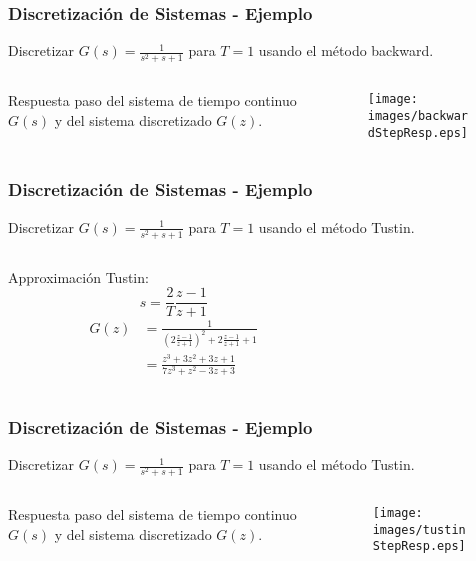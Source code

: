 \documentclass[aspectratio=169,handout]{beamer}
\theoremstyle{definition}
\theoremstyle{plain}
\theoremstyle{remark}
\begin{document}
\begin{frame}[c]\frametitle{Discretización de Sistemas - Ejemplo}
	\vspace*{3mm}	
	Discretizar $G(s) = \frac{1}{s^2 + s + 1}$ para $T=1$ usando el método backward.\\
	\begin{columns}
		\begin{column}{0.3\textwidth}
			Respuesta paso del sistema de tiempo continuo $G(s)$ y del sistema discretizado $G(z)$.
		\end{column}
		\begin{column}{0.7\textwidth}
			\begin{figure}
				\centering
				\texttt{[image: images/backwardStepResp.eps]}
			\end{figure}
		\end{column}
	\end{columns}
\end{frame}

\begin{frame}[c]\frametitle{Discretización de Sistemas - Ejemplo}
	\vspace*{3mm}	
	Discretizar $G(s) = \frac{1}{s^2 + s + 1}$ para $T=1$ usando el método Tustin.\\
	\pause
	\vspace*{4mm}	
	\begin{columns}
		\begin{column}{0.3\textwidth}
			Approximación Tustin:
			\begin{equation*}
				s = \frac{2}{T}\frac{z-1}{z+1}
			\end{equation*}
			\pause
			\begin{align*}
				G(z) &= \frac{1}{\left(2\frac{z-1}{z+1}\right)^2 + 2\frac{z-1}{z+1} + 1}\\
				&= \frac{z^3+3z^2+3z+1}{7z^3+z^2-3z+3}
			\end{align*}
		\end{column}
		\pause
		\begin{column}{0.7\textwidth}
			
		\end{column}
	\end{columns}
\end{frame}

\begin{frame}[c]\frametitle{Discretización de Sistemas - Ejemplo}
	\vspace*{3mm}	
	Discretizar $G(s) = \frac{1}{s^2 + s + 1}$ para $T=1$ usando el método Tustin.\\
	\begin{columns}
		\begin{column}{0.3\textwidth}
			Respuesta paso del sistema de tiempo continuo $G(s)$ y del sistema discretizado $G(z)$.
		\end{column}
		\begin{column}{0.7\textwidth}
			\begin{figure}
				\centering
				\texttt{[image: images/tustinStepResp.eps]}
			\end{figure}
		\end{column}
	\end{columns}
\end{frame}
\end{document}
